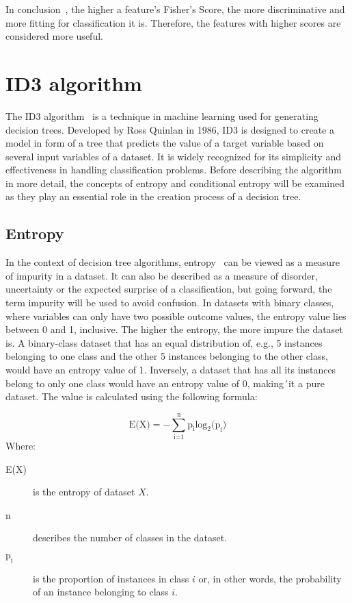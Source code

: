 In conclusion~\cite{feature_selection}, the higher a feature's Fisher's Score, the more discriminative and more fitting for classification it is. Therefore, the features with higher scores are considered more useful.

\section{ID3 algorithm} \label{ID3}
The ID3 algorithm~\cite{id3_algorithm_wiki} is a technique in machine learning used for generating decision trees. Developed by Ross Quinlan in 1986, ID3 is designed to create a model in form of a tree that predicts the value of a target variable based on several input variables of a dataset. It is widely recognized for its simplicity and effectiveness in handling classification problems. Before describing the algorithm in more detail, the concepts of entropy and conditional entropy will be examined as they play an essential role in the creation process of a decision tree.

\subsection{Entropy} \label{entropy}
In the context of decision tree algorithms, entropy~\cite{entropy_dash} can be viewed as a measure of impurity in a dataset. It can also be described as a measure of disorder, uncertainty or the expected surprise of a classification, but going forward, the term impurity will be used to avoid confusion. In datasets with binary classes, where variables can only have two possible outcome values, the entropy value lies between 0 and 1, inclusive. The higher the entropy, the more impure the dataset is. A binary-class dataset that has an equal distribution of, e.g., 5 instances belonging to one class and the other 5 instances belonging to the other class, would have an entropy value of 1. Inversely, a dataset that has all its instances belong to only one class would have an entropy value of 0, making´it a pure dataset.
The value is calculated using the following formula:

\[ \text{E(X)} = -\sum_\text{i=1}^\text{n} \text{p}_\text{i} {\text{log}_\text{2} \text{(p}_\text{i})} \]
Where:
\begin{description}
	\item[E(X)] is the entropy of dataset $X$.
	\item[n] describes the number of classes in the dataset.
    \item[$\text{p}_\text{i}$] is the proportion of instances in class $i$ or, in other words, the probability of an instance belonging to class $i$.
\end{description}


